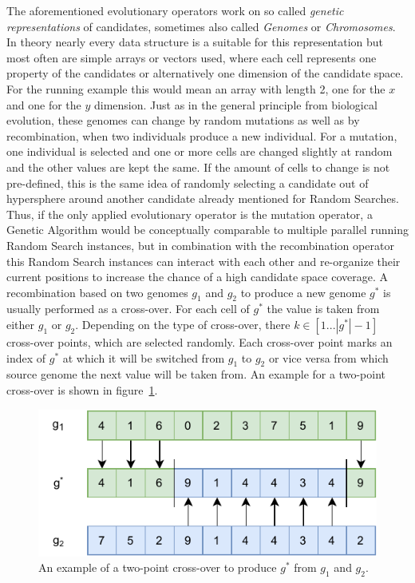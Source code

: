The aforementioned evolutionary operators work on so called \textit{genetic representations} of candidates, sometimes also called \textit{Genomes} or \textit{Chromosomes}.
In theory nearly every data structure is a suitable for this representation but most often are simple arrays or vectors used, where each cell represents one property of the candidates or alternatively one dimension of the candidate space.
For the running example this would mean an array with length 2, one for the $x$ and one for the $y$ dimension.\newline
Just as in the general principle from biological evolution, these genomes can change by random mutations as well as by recombination, when two individuals produce a new individual.
For a mutation, one individual is selected and one or more cells are changed slightly at random and the other values are kept the same.
If the amount of cells to change is not pre-defined, this is the same idea of randomly selecting a candidate out of hypersphere around another candidate already mentioned for Random Searches.
Thus, if the only applied evolutionary operator is the mutation operator, a Genetic Algorithm would be conceptually comparable to multiple parallel running Random Search instances, but in combination with the recombination operator this Random Search instances can interact with each other and re-organize their current positions to increase the chance of a high candidate space coverage.\newline
A recombination based on two genomes $g_1$ and $g_2$ to produce a new genome $g^*$ is usually performed as a cross-over.
For each cell of $g^*$ the value is taken from either $g_1$ or $g_2$.
Depending on the type of cross-over, there $k \in [1 ... |g^*| - 1]$ cross-over points, which are selected randomly.
Each cross-over point marks an index of $g^*$ at which it will be switched from $g_1$ to $g_2$ or vice versa from which source genome the next value will be taken from.
An example for a two-point cross-over is shown in figure~\ref{fig:theory:crossover}.
\begin{figure}[ht!]
    \centering
    \includegraphics[width=\textwidth]{gfx/Figures/Theory/Crossover.pdf}
    \caption{An example of a two-point cross-over to produce $g^*$ from $g_1$ and $g_2$.}
    \label{fig:theory:crossover}
\end{figure}
